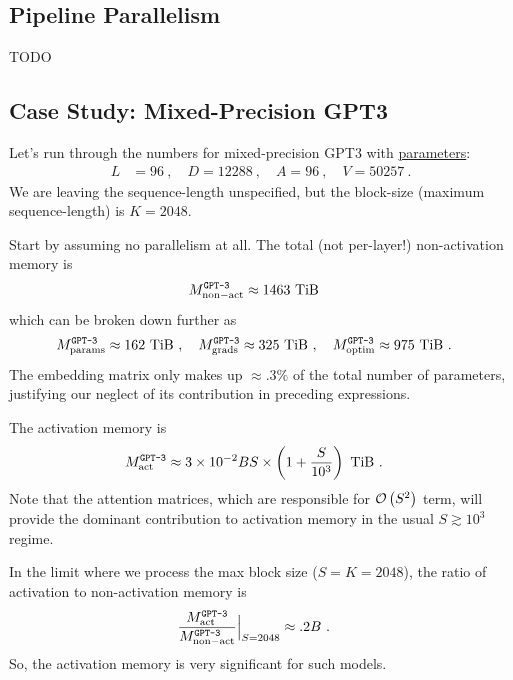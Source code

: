 \documentclass[11pt]{article}
\begin{document}
\subsection{Pipeline Parallelism \label{subsec_pipe_parallelism}}

TODO






\subsection{Case Study: Mixed-Precision GPT3 \label{subsec_gpt_mem_study} }

Let's run through the numbers for mixed-precision GPT3 with
\href{https://bmk.sh/2020/05/29/GPT-3-A-Brief-Summary/}{parameters}:
\begin{align}
	L & = 96 \ , \quad
	D = 12288 \ ,\quad
	A = 96\ , \quad V = 50257\ .
	\label{eq_gpt_num}
\end{align}
We are leaving the sequence-length unspecified, but the block-size (maximum sequence-length) is $
	K=2048 $.


Start by assuming no parallelism at all. The total (not per-layer!) non-activation memory is
\begin{align}
	M _{ {\rm non-act}  } ^ \texttt{GPT-3} & \approx 1463\ {\rm TiB}
\end{align}
which can be broken down further as
\begin{align}
	M _{ {\rm params}  } ^ \texttt{GPT-3} & \approx 162\ {\rm TiB} \ , \quad
	M _{ {\rm grads}  } ^ \texttt{GPT-3}  \approx 325\ {\rm TiB}\ , \quad
	M _{ {\rm optim}  } ^ \texttt{GPT-3}  \approx 975\ {\rm TiB}\ .
\end{align}
The embedding matrix only makes up $ \approx .3\% $ of the total number of parameters, justifying our
neglect of its contribution in preceding expressions.


The activation memory is
\begin{align}
	M _{ {\rm act}  } ^ \texttt{GPT-3} & \approx 3 \times 10 ^{ -2 }BS\times  \left (  1  + \frac{ S
	}{ 10 ^{ 3 } } \right ) \ {\rm TiB} \ .
\end{align}
Note that the attention matrices, which are responsible for $ \mathcal{O} \left( S ^{ 2 } \right)  $ term, will
provide the dominant contribution to activation memory in the usual $ S \gtrsim 10 ^{ 3 } $ regime.

In the limit where we process the max block size ($ S=K=2048 $), the ratio of activation to
non-activation memory is
\begin{align}
	\frac{  M _{ {\rm act}  } ^ \texttt{GPT-3}}{ M _{ {\rm non-act}  } ^ \texttt{GPT-3} }\Big| _{
	S=2048 } & \approx  .2 B \ .
\end{align}
So, the activation memory is very significant for such models.
\end{document}
